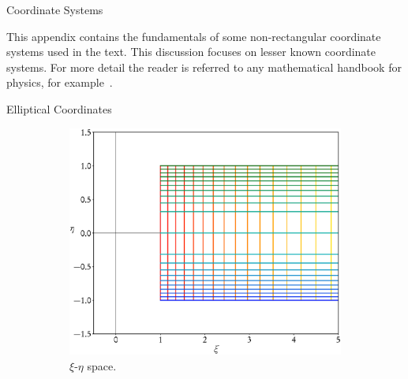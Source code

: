 \documentclass[letterpaper, 11 pt]{report}
\begin{document}
\begin{appendices}

   \begin{chapter}{Coordinate Systems \label{chap:coords}}

      This appendix contains the fundamentals of some non-rectangular coordinate systems used in the
      text. This discussion focuses on lesser known coordinate systems. For more detail the reader
      is referred to any mathematical handbook for physics, for example~\cite{coord1, coord2}.

      \begin{section}{Elliptical Coordinates \label{sec:elliptic}}

         \begin{figure}[t]
            \centering
            \begin{subfigure}{.5\textwidth}
               \centering
               \includegraphics[width=\linewidth]{./images/appendix/xieta.eps}
               \caption{$\xi$-$\eta$ space. \label{fig:xieta}}
            \end{subfigure}%
            \begin{subfigure}{.5\textwidth}
               \centering

\end{subfigure}
\end{figure}
\end{section}
\end{chapter}
\end{appendices}
\end{document}
